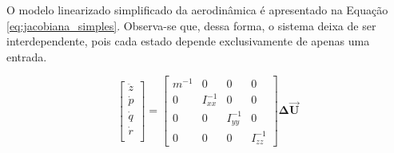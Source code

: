\documentclass[main.tex]{subfiles}
\begin{document}
O modelo linearizado simplificado da aerodinâmica é apresentado na Equação \ref{eq:jacobiana_simples}. Observa-se que, dessa forma, o sistema deixa de ser interdependente, pois cada estado depende exclusivamente de apenas uma entrada.

\begin{equation}\label{eq:jacobiana_simples}
	\begin{bmatrix}
		\ddot{z}\\
		\dot{p}\\
		\dot{q}\\
		\dot{r}\\
	\end{bmatrix} = \begin{bmatrix}
		m^{-1} & 0 & 0 & 0\\
		
		0 & I_{xx}^{-1} & 0 & 0\\
		
		0 & 0 & I_{yy}^{-1} & 0\\
		
		0 & 0 & 0 & I_{zz}^{-1}
	\end{bmatrix}\boldsymbol{\Delta \vec{U}}
\end{equation}
\end{document}
